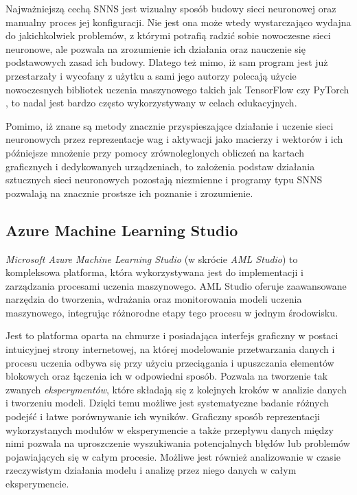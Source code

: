 Najważniejszą cechą SNNS jest wizualny sposób budowy sieci neuronowej oraz manualny proces jej konfiguracji.
Nie jest ona może wtedy wystarczająco wydajna do jakichkolwiek problemów, z którymi potrafią radzić sobie nowoczesne sieci neuronowe, ale pozwala na zrozumienie ich działania oraz nauczenie się podstawowych zasad ich budowy.
Dlatego też mimo, iż sam program jest już przestarzały i wycofany z użytku a sami jego autorzy polecają użycie nowoczesnych bibliotek uczenia maszynowego takich jak TensorFlow czy PyTorch \cite{snns}, to nadal jest bardzo często wykorzystywany w celach edukacyjnych.

Pomimo, iż znane są metody znacznie przyspieszające działanie i uczenie sieci neuronowych przez reprezentacje wag i aktywacji jako macierzy i wektorów i ich późniejsze mnożenie przy pomocy zrównoleglonych obliczeń na kartach graficznych i dedykowanych urządzeniach, to założenia podstaw działania sztucznych sieci neuronowych pozostają niezmienne i programy typu SNNS pozwalają na znacznie prostsze ich poznanie i zrozumienie.

\subsection{Azure Machine Learning Studio}

\emph{Microsoft Azure Machine Learning Studio} (w skrócie \emph{AML Studio}) to kompleksowa platforma, która wykorzystywana jest do implementacji i zarządzania procesami uczenia maszynowego.
AML Studio oferuje zaawansowane narzędzia do tworzenia, wdrażania oraz monitorowania modeli uczenia maszynowego, integrując różnorodne etapy tego procesu w jednym środowisku.

Jest to platforma oparta na chmurze i posiadająca interfejs graficzny w postaci intuicyjnej strony internetowej, na której modelowanie przetwarzania danych i procesu uczenia odbywa się przy użyciu przeciągania i upuszczania elementów blokowych oraz łączenia ich w odpowiedni sposób.
Pozwala na tworzenie tak zwanych \emph{eksperymentów}, które składają się z kolejnych kroków w analizie danych i tworzeniu modeli.
Dzięki temu możliwe jest systematyczne badanie różnych podejść i łatwe porównywanie ich wyników.
Graficzny sposób reprezentacji wykorzystanych modułów w eksperymencie a także przepływu danych między nimi pozwala na uproszczenie wyszukiwania potencjalnych błędów lub problemów pojawiających się w całym procesie.
Możliwe jest również analizowanie w czasie rzeczywistym działania modelu i analizę przez niego danych w całym eksperymencie.

